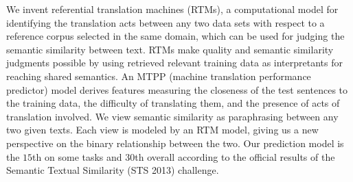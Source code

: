 We invent referential translation machines (RTMs), a computational model for identifying the 
 translation acts between any two data sets with respect to a reference corpus 
 selected in the same domain, 
 which can be used for judging the semantic similarity between text.
 RTMs make quality and semantic similarity judgments possible by using retrieved
 relevant training data as interpretants for reaching shared semantics.
 An MTPP (machine translation performance predictor) model derives
 features measuring the closeness of the test sentences to the
 training data, the difficulty of translating them, 
 and the presence of acts of translation involved.
 We view semantic similarity as paraphrasing between any two given texts.
 Each view is modeled by an RTM model, giving us a new
 perspective on the binary relationship between the two.
 Our prediction model is the 
 $15$th on some tasks and $30$th overall according to the official
 results of the Semantic Textual Similarity (STS 2013) challenge.

